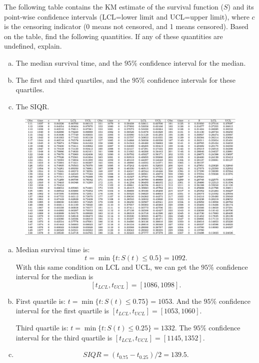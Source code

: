 \documentclass[12pt]{elegantbook}
\begin{document}
    \begin{exercise*}[4]
        The following table contains the KM estimate of the survival function ($S$) and its point-wise confidence intervals (LCL=lower limit and UCL=upper limit), where $c$ is the censoring indicator (0 means not censored, and 1 means censored). Based on the table, find the following quantities. If any of these quantities are undefined, explain. 
        \begin{enumerate}[(a)]
            \item The median survival time, and the $95\%$ confidence interval for the median.
            \item The first and third quartiles, and the $95\%$ confidence intervals for these quartiles.
            \item The SIQR. 
        \end{enumerate}
        \begin{figure}[H]
            \centering
            \includegraphics[width=\textwidth]{HW1_4.png}
        \end{figure}
    \end{exercise*}
    \begin{solution}
        \begin{enumerate}[(a)]
            \item Median survival time is: 
            \[t=\min\{t:S(t)\leq0.5\}=1092. \] 
            With this same condition on LCL and UCL, we can get the $95\%$ confidence interval for the median is \[[t_{LCL},t_{UCL}]=[1086,1098]. \]
            \item First quartile is: $t=\min\{t:S(t)\leq0.75\}=1053$. And the $95\%$ confidence interval for the first quartile is $[t_{LCL},t_{UCL}]=[1053,1060]$. 
            
            Third quartile is: $t=\min\{t:S(t)\leq0.25\}=1332$. The $95\%$ confidence interval for the third quartile is $[t_{LCL},t_{UCL}]=[1145,1352]$. 
            \item \[SIQR=(t_{0.75}-t_{0.25})/2=139.5. \]
        \end{enumerate}
    \end{solution}
\end{document}
